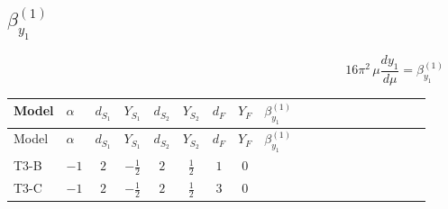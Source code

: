 \documentclass{article}
\begin{document}
\begin{landscape}
\section*{$\beta_{y_1}^{(1)}$}
\[16\pi^2\,\mu\frac{d y_1}{d\mu}=\beta_{y_1}^{(1)}\]
\tiny
\begin{longtable}{@{}llcccccc >{\raggedright\arraybackslash}p{0.54\linewidth}@{}}
\toprule
Model & $\alpha$ & $d_{S_1}$ & $Y_{S_1}$ & $d_{S_2}$ & $Y_{S_2}$ & $d_F$ & $Y_F$ & $\beta_{y_1}^{(1)}$ \\
\midrule
\endfirsthead
\toprule
Model & $\alpha$ & $d_{S_1}$ & $Y_{S_1}$ & $d_{S_2}$ & $Y_{S_2}$ & $d_F$ & $Y_F$ & $\beta_{y_1}^{(1)}$ \\
\midrule
\endhead
T3-B & $-1$ & $2$ & $-\frac{1}{2}$ & $2$ & $\frac{1}{2}$ & $1$ & $0$ & \scriptsize\adjustbox{max width=\linewidth}{$\begin{gathered} \operatorname{Tr}\!\left({y_1}\,\left({y_2}\right)^{\dagger}\right) \left({y_2}\right)_{ij} \\ +\operatorname{Tr}\!\left({y_1}\,\left({y_1}\right)^{\dagger}\right) \left({y_1}\right)_{ij} \\ +\frac{1}{2} (2 \left({y_1}\,\left({y_2}\right)^{\dagger}\,{y_2}\right)_{ij}+\left({y_2}\,\left({y_2}\right)^{\dagger}\,{y_1}\right)_{ij}+\left({Y_e}\,\left({Y_e}\right)^{\dagger}\,{y_1}\right)_{ij}+3 \left({y_1}\,\left({y_1}\right)^{\dagger}\,{y_1}\right)_{ij}) \\ -\frac{9}{4} {g_2}^2 \left({y_1}\right)_{ij} \\ -\frac{3}{4} {g_Y}^2 \left({y_1}\right)_{ij}\end{gathered}$} \\
\midrule
T3-C & $-1$ & $2$ & $-\frac{1}{2}$ & $2$ & $\frac{1}{2}$ & $3$ & $0$ & \scriptsize\adjustbox{max width=\linewidth}{$\begin{gathered} \frac{3}{2} \operatorname{Tr}\!\left({y_1}\,\left({y_2}\right)^{\dagger}\right) \left({y_2}\right)_{ij} \\ +\frac{3}{2} \operatorname{Tr}\!\left({y_1}\,\left({y_1}\right)^{\dagger}\right) \left({y_1}\right)_{ij} \\ +\frac{1}{4} (2 \left({y_1}\,\left({y_2}\right)^{\dagger}\,{y_2}\right)_{ij}+3 \left({y_2}\,\left({y_2}\right)^{\dagger}\,{y_1}\right)_{ij}+2 \left({Y_e}\,\left({Y_e}\right)^{\dagger}\,{y_1}\right)_{ij}+5 \left({y_1}\,\left({y_1}\right)^{\dagger}\,{y_1}\right)_{ij}) \\ -\frac{33}{4} {g_2}^2 \left({y_1}\right)_{ij} \\ -\frac{3}{4} {g_Y}^2 \left({y_1}\right)_{ij}\end{gathered}$} \\

\end{longtable}
\end{landscape}
\end{document}
